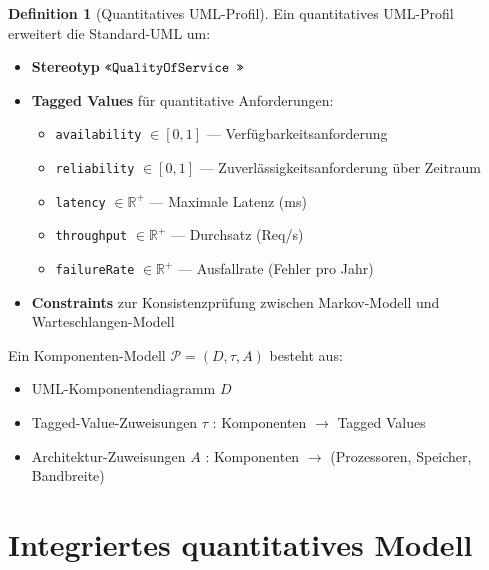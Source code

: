 \documentclass[a4paper,11pt]{article}
\theoremstyle{definition}
\newtheorem{definition}{Definition}
\begin{document}
\begin{definition}[Quantitatives UML-Profil]
    \label{def:uml_profile}
    Ein quantitatives UML-Profil erweitert die Standard-UML um:
    \begin{itemize}
        \item \textbf{Stereotyp} $\texttt{\guillemotleft QualityOfService \guillemotright}$
        \item \textbf{Tagged Values} für quantitative Anforderungen:
            \begin{itemize}
                \item \texttt{availability} $\in [0, 1]$ --- Verfügbarkeitsanforderung
                \item \texttt{reliability} $\in [0, 1]$ --- Zuverlässigkeitsanforderung über Zeitraum
                \item \texttt{latency} $\in \mathbb{R}^+$ --- Maximale Latenz (ms)
                \item \texttt{throughput} $\in \mathbb{R}^+$ --- Durchsatz (Req/s)
                \item \texttt{failureRate} $\in \mathbb{R}^+$ --- Ausfallrate (Fehler pro Jahr)
            \end{itemize}
        \item \textbf{Constraints} zur Konsistenzprüfung zwischen Markov-Modell und Warteschlangen-Modell
    \end{itemize}

    Ein Komponenten-Modell $\mathcal{P} = (D, \tau, A)$ besteht aus:
    \begin{itemize}
        \item UML-Komponentendiagramm $D$
        \item Tagged-Value-Zuweisungen $\tau$ : Komponenten $\to$ Tagged Values
        \item Architektur-Zuweisungen $A$ : Komponenten $\to$ (Prozessoren, Speicher, Bandbreite)
    \end{itemize}
\end{definition}

\section{Integriertes quantitatives Modell}
\end{document}
